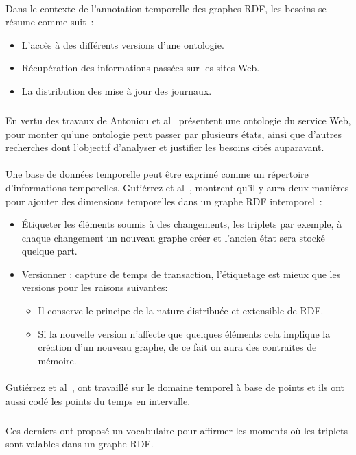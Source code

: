 \documentclass[12pt,a4	]{report}
\begin{document}
\paragraph{}
Dans le contexte de l'annotation temporelle des graphes RDF, les besoins se résume comme suit~:
\begin{itemize}
\item L'accès à des différents versions d’une ontologie.
\item Récupération des informations passées sur les sites Web.
\item La distribution des mise à jour des journaux.
\end{itemize}
\subparagraph{}
En vertu des travaux de Antoniou et al~\cite{antoniou2004} présentent une ontologie du service Web, pour monter qu'une ontologie peut passer par plusieurs états, ainsi que d'autres recherches dont l'objectif d'analyser et justifier les besoins cités auparavant.
\paragraph{}
Une base de données temporelle peut être exprimé comme un répertoire d'informations temporelles.
Gutiérrez et al~\cite{gutierrez2007}, montrent qu'il y aura deux manières pour ajouter des dimensions temporelles dans un graphe RDF intemporel~:
\begin{itemize}
\item Étiqueter les éléments soumis à des changements, les triplets par exemple, à chaque changement un nouveau graphe créer et l’ancien état sera stocké quelque part.
\item Versionner : capture de temps de transaction, l’étiquetage est mieux que les versions pour les raisons suivantes: 
 \begin{itemize}
\item Il conserve le principe de la nature distribuée et extensible de RDF.
\item Si la nouvelle version n’affecte que quelques éléments cela implique la création d’un nouveau graphe, de ce fait on aura des contraites de mémoire.
\end{itemize}
\end{itemize}
\paragraph{}
Gutiérrez et al~\cite{gutierrez2007}, ont travaillé sur le domaine temporel à base de points et ils ont aussi codé les points du temps en intervalle.
\subparagraph{}
Ces derniers ont proposé un vocabulaire pour affirmer les moments où les triplets sont valables dans un graphe RDF.
\end{document}
